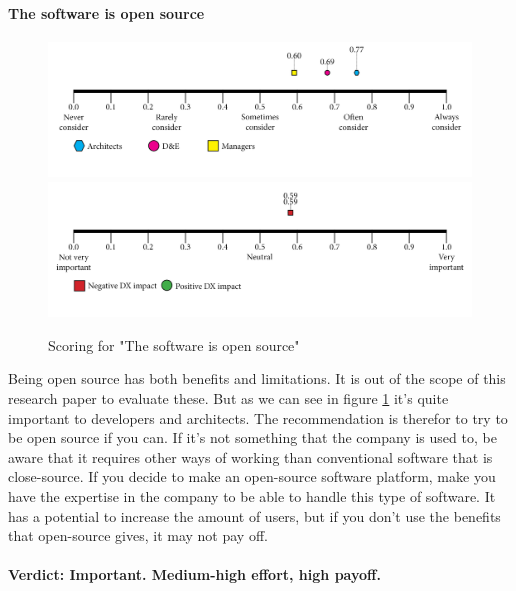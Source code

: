 \documentclass{article}
\begin{document}
\paragraph{The software is open source}
\begin{figure}[H]
\centering
\includegraphics[width=\linewidth]{scorelines/aspect14.png}
\includegraphics[width=\linewidth]{dxscorelines/dxaspect14.png}
\caption{Scoring for "The software is open source"}
\label{fig:aspect14}
\end{figure}
Being open source has both benefits and limitations. It is out of the scope of this research paper to evaluate these. But as we can see in figure \ref{fig:aspect14} it's quite important to developers and architects. The recommendation is therefor to try to be open source if you can. If it's not something that the company is used to, be aware that it requires other ways of working than conventional software that is close-source. If you decide to make an open-source software platform, make you have the expertise in the company to be able to handle this type of software. It has a potential to increase the amount of users, but if you don't use the benefits that open-source gives, it may not pay off. \\ \\
\textbf{Verdict: Important. Medium-high effort, high payoff.}
\end{document}
